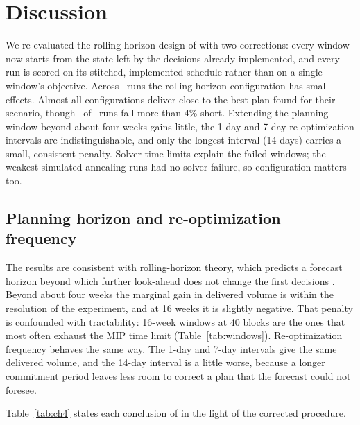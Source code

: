 \section{Discussion}

We re-evaluated the rolling-horizon design of \citet{jaffray2026thesis} with two corrections: every
window now starts from the state left by the decisions already implemented, and every run is scored
on its stitched, implemented schedule rather than on a single window's objective. Across
\NRollingRuns\ runs the rolling-horizon configuration has small effects. Almost all configurations
deliver close to the best plan found for their scenario, though \NRunsBeyondFourPct\ of
\NRollingRuns\ runs fall more than 4\% short. Extending the planning window
beyond about four weeks gains little, the 1-day and 7-day re-optimization intervals are
indistinguishable, and only the longest interval (14 days) carries a small, consistent penalty.
Solver time limits explain the failed windows; the weakest simulated-annealing runs had no solver
failure, so configuration matters too.

\subsection{Planning horizon and re-optimization frequency}

The results are consistent with rolling-horizon theory, which predicts a forecast horizon beyond
which further look-ahead does not change the first decisions
\citep{baker1979analytic,sethi1991theory,sahin2008master}. Beyond about four weeks the marginal gain
in delivered volume is within the resolution of the experiment, and at 16 weeks it is slightly
negative. That penalty is confounded with tractability: 16-week windows at 40 blocks are the ones
that most often exhaust the MIP time limit (Table~\ref{tab:windows}). Re-optimization frequency
behaves the same way. The 1-day and 7-day intervals give the same delivered volume, and the 14-day
interval is a little worse, because a longer commitment period leaves less room to correct a plan
that the forecast could not foresee.

Table~\ref{tab:ch4} states each conclusion of \citet{jaffray2026thesis} in the light of the
corrected procedure.

